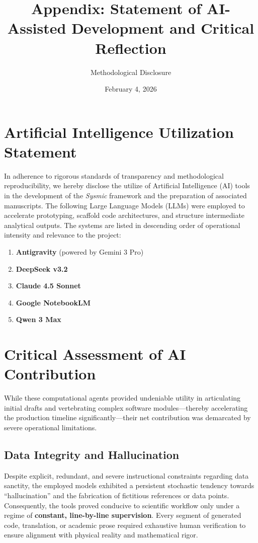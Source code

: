 \documentclass[11pt]{article}
\title{\textbf{Appendix: Statement of AI-Assisted Development and Critical Reflection}}
\author{Methodological Disclosure}
\date{February 4, 2026}
\begin{document}
\maketitle

\section*{Artificial Intelligence Utilization Statement}

In adherence to rigorous standards of transparency and methodological reproducibility, we hereby disclose the utilize of Artificial Intelligence (AI) tools in the development of the \textit{Sysmic} framework and the preparation of associated manuscripts. The following Large Language Models (LLMs) were employed to accelerate prototyping, scaffold code architectures, and structure intermediate analytical outputs. The systems are listed in descending order of operational intensity and relevance to the project:

\begin{enumerate}
    \item \textbf{Antigravity} (powered by Gemini 3 Pro)
    \item \textbf{DeepSeek v3.2}
    \item \textbf{Claude 4.5 Sonnet}
    \item \textbf{Google NotebookLM}
    \item \textbf{Qwen 3 Max}
\end{enumerate}

\section*{Critical Assessment of AI Contribution}

While these computational agents provided undeniable utility in articulating initial drafts and vertebrating complex software modules—thereby accelerating the production timeline significantly—their net contribution was demarcated by severe operational limitations.

\subsection*{Data Integrity and Hallucination}
Despite explicit, redundant, and severe instructional constraints regarding data sanctity, the employed models exhibited a persistent stochastic tendency towards ``hallucination'' and the fabrication of fictitious references or data points. Consequently, the tools proved conducive to scientific workflow only under a regime of \textbf{constant, line-by-line supervision}. Every segment of generated code, translation, or academic prose required exhaustive human verification to ensure alignment with physical reality and mathematical rigor.
\end{document}
